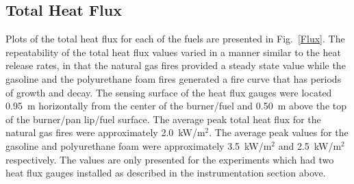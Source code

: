 \documentclass[twoside]{uocthesis}
\begin{document}
{\subsection{Total Heat Flux}

Plots of the total heat flux for each of the fuels are presented in Fig.~\ref{Flux}. The repeatability of the total heat flux values varied in a manner similar to the heat release rates, in that the natural gas fires provided a steady state value while the gasoline and the polyurethane foam fires generated a fire curve that has periods of growth and decay.   The sensing surface of the heat flux gauges were located 0.95~m horizontally from the center of the burner/fuel and 0.50~m above the top of the burner/pan lip/fuel surface.  The average peak total heat flux for the natural gas fires were approximately 2.0~kW/m$^2$.  The average peak values for the gasoline and polyurethane foam were approximately 3.5~kW/m$^2$ and 2.5~kW/m$^2$ respectively.  The values are only presented for the experiments which had two heat flux gauges installed as described in the instrumentation section above.

}
\end{document}
